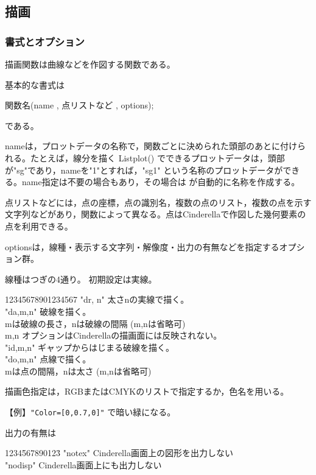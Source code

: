 \documentclass[papersize,a4paper,12pt,uplatex]{jsarticle}
\begin{document}
\newpage
\subsection{描画}
\subsubsection{書式とオプション}

描画関数は曲線などを作図する関数である。

基本的な書式は

\hspace{20mm} 関数名(name , 点リストなど , options);

である。

nameは，プロットデータの名称で，関数ごとに決められた頭部のあとに付けられる。たとえば，線分を描く Listplot() でできるプロットデータは，頭部が"sg"であり，nameを"1"とすれば，"sg1" という名称のプロットデータができる。name指定は不要の場合もあり，その場合は \ketcindy が自動的に名称を作成する。

点リストなどには，点の座標，点の識別名，複数の点のリスト，複数の点を示す文字列などがあり，関数によって異なる。点はCinderellaで作図した幾何要素の点を利用できる。

optionsは，線種・表示する文字列・解像度・出力の有無などを指定するオプション群。

 線種はつぎの4通り。 初期設定は実線。

\begin{tabbing}
1234\=5678901234567\=\kill
  \>    "dr, n"     \>太さnの実線で描く。\\
  \>    "da,m,n"  \>破線を描く。\\
  \>                \> mは破線の長さ，nは破線の間隔  (m,nは省略可)\\
  \>                 \>m,n オプションはCinderellaの描画面には反映されない。\\
  \>    "id,m,n"   \>ギャップからはじまる破線を描く。\\
  \>    "do,m,n"  \>点線で描く。\\
  \>                \>mは点の間隔，nは太さ  (m,nは省略可)
\end{tabbing}

描画色指定は，RGBまたはCMYKのリストで指定するか，色名を用いる。

\hspace{10mm}【例】\verb|"Color=[0,0.7,0]"| で暗い緑になる。

出力の有無は
\begin{tabbing}
  1234\=567890123\=\kill
 \>    "notex"  \>Cinderella画面上の図形を出力しない\\
 \>    "nodisp" \>Cinderella画面上にも出力しない
 \end{tabbing}
 
\end{document}
